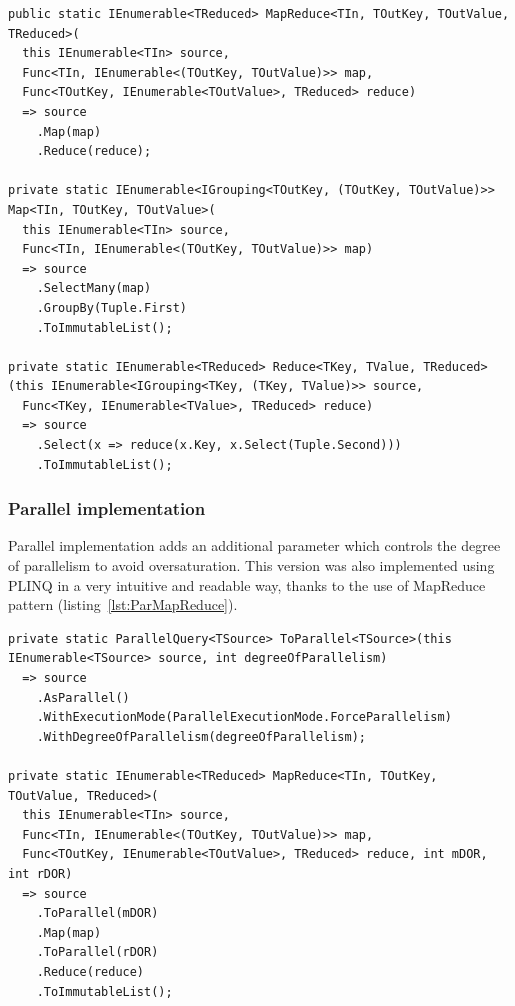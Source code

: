 \begin{lstlisting}[language={[sharp]c}, style=sharpcstyle, caption={Sequential \texttt{MapReduce} implementation}, label={lst:SeqMapReduce},
numbers=none, xleftmargin=0pt,framexleftmargin=0pt,framexrightmargin=0pt,framexbottommargin=0pt]
public static IEnumerable<TReduced> MapReduce<TIn, TOutKey, TOutValue, TReduced>(
  this IEnumerable<TIn> source,
  Func<TIn, IEnumerable<(TOutKey, TOutValue)>> map,
  Func<TOutKey, IEnumerable<TOutValue>, TReduced> reduce)
  => source
    .Map(map)
    .Reduce(reduce);

private static IEnumerable<IGrouping<TOutKey, (TOutKey, TOutValue)>> Map<TIn, TOutKey, TOutValue>(
  this IEnumerable<TIn> source,
  Func<TIn, IEnumerable<(TOutKey, TOutValue)>> map)
  => source
    .SelectMany(map)
    .GroupBy(Tuple.First)
    .ToImmutableList();

private static IEnumerable<TReduced> Reduce<TKey, TValue, TReduced>
(this IEnumerable<IGrouping<TKey, (TKey, TValue)>> source,
  Func<TKey, IEnumerable<TValue>, TReduced> reduce)
  => source
    .Select(x => reduce(x.Key, x.Select(Tuple.Second)))
    .ToImmutableList();

\end{lstlisting}

\subsubsection{Parallel implementation}
Parallel implementation adds an additional parameter which controls the degree of parallelism to avoid oversaturation. This version was also implemented using PLINQ in a very intuitive and readable way, thanks to the use of MapReduce pattern (listing~\ref{lst:ParMapReduce}).

\begin{lstlisting}[language={[sharp]c}, style=sharpcstyle, caption={Parallel \texttt{MapReduce} implementation}, label={lst:ParMapReduce},
numbers=none, xleftmargin=0pt,framexleftmargin=0pt,framexrightmargin=0pt,framexbottommargin=0pt]
private static ParallelQuery<TSource> ToParallel<TSource>(this IEnumerable<TSource> source, int degreeOfParallelism)
  => source
    .AsParallel()
    .WithExecutionMode(ParallelExecutionMode.ForceParallelism)
    .WithDegreeOfParallelism(degreeOfParallelism);

private static IEnumerable<TReduced> MapReduce<TIn, TOutKey, TOutValue, TReduced>(
  this IEnumerable<TIn> source,
  Func<TIn, IEnumerable<(TOutKey, TOutValue)>> map,
  Func<TOutKey, IEnumerable<TOutValue>, TReduced> reduce, int mDOR, int rDOR)
  => source
    .ToParallel(mDOR)
    .Map(map)
    .ToParallel(rDOR)
    .Reduce(reduce)
    .ToImmutableList();
\end{lstlisting}

